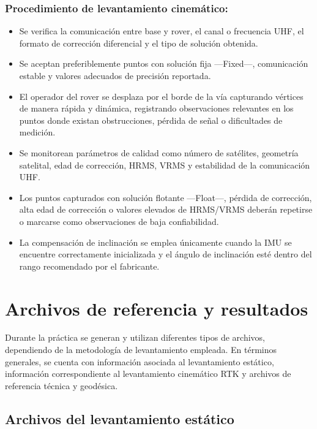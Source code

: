 \documentclass[
  letterpaper,
  DIV=11,
  numbers=noendperiod]{scrartcl}
\providecommand{\tightlist}{%
  \setlength{\itemsep}{0pt}\setlength{\parskip}{0pt}}\usepackage{longtable,booktabs,array}
\begin{document}
\subsubsection{Procedimiento de levantamiento
cinemático:}\label{procedimiento-de-levantamiento-cinemuxe1tico}

\begin{itemize}
\tightlist
\item
  Se verifica la comunicación entre base y rover, el canal o frecuencia
  UHF, el formato de corrección diferencial y el tipo de solución
  obtenida.
\item
  Se aceptan preferiblemente puntos con solución fija ---Fixed---,
  comunicación estable y valores adecuados de precisión reportada.
\item
  El operador del rover se desplaza por el borde de la vía capturando
  vértices de manera rápida y dinámica, registrando observaciones
  relevantes en los puntos donde existan obstrucciones, pérdida de señal
  o dificultades de medición.
\item
  Se monitorean parámetros de calidad como número de satélites,
  geometría satelital, edad de corrección, HRMS, VRMS y estabilidad de
  la comunicación UHF.
\item
  Los puntos capturados con solución flotante ---Float---, pérdida de
  corrección, alta edad de corrección o valores elevados de HRMS/VRMS
  deberán repetirse o marcarse como observaciones de baja confiabilidad.
\item
  La compensación de inclinación se emplea únicamente cuando la IMU se
  encuentre correctamente inicializada y el ángulo de inclinación esté
  dentro del rango recomendado por el fabricante.
\end{itemize}

\section{Archivos de referencia y
resultados}\label{archivos-de-referencia-y-resultados}

Durante la práctica se generan y utilizan diferentes tipos de archivos,
dependiendo de la metodología de levantamiento empleada. En términos
generales, se cuenta con información asociada al levantamiento estático,
información correspondiente al levantamiento cinemático RTK y archivos
de referencia técnica y geodésica.

\subsection{Archivos del levantamiento
estático}\label{archivos-del-levantamiento-estuxe1tico}
\end{document}
